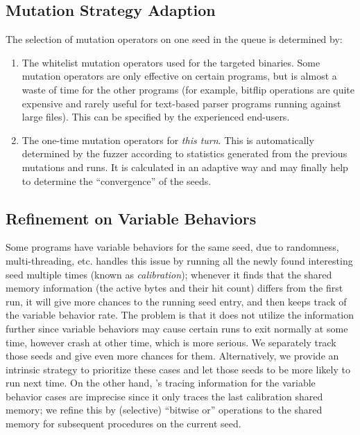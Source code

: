   \subsection{Mutation Strategy Adaption}\label{sec:mutation_ops}
 The selection of mutation operators on one seed in the queue is determined by:
 \begin{enumerate}[1.]
 	\item The whitelist mutation operators used for the targeted binaries. Some mutation operators are only effective on certain programs, but is almost a waste of time for the other programs (for example, bitflip operations are quite expensive and rarely useful for text-based parser programs running against large files). This can be specified by the experienced {\FOT} end-users.
 	\item The one-time mutation operators for \emph{this turn}. This is automatically determined by the fuzzer according to statistics generated from the previous mutations and runs. It is calculated in an adaptive way and may finally help to determine the ``convergence'' of the seeds.
 \end{enumerate}



\subsection{Refinement on Variable Behaviors}\label{sec:entry_var_behavior}

Some programs have variable behaviors for the same seed, due to randomness, multi-threading, etc. {\AFL} handles this issue by running all the newly found interesting seed multiple times (known as \emph{calibration}); whenever it finds that the shared memory information (the active bytes and their hit count) differs from the first run, it will give more chances to the running seed entry, and then keeps track of the variable behavior rate. The problem is that it does not utilize the information further since variable behaviors may cause certain runs to exit normally at some time, however crash at other time, which is more serious. We separately track those seeds and give even more chances for them. Alternatively, we provide an intrinsic strategy to prioritize these cases and let those seeds to be more likely to run next time. On the other hand, {\AFL}'s tracing information for the variable behavior cases are imprecise since it only traces the last calibration shared memory; we refine this by (selective) ``bitwise or'' operations to the shared memory for subsequent procedures on the current seed.


